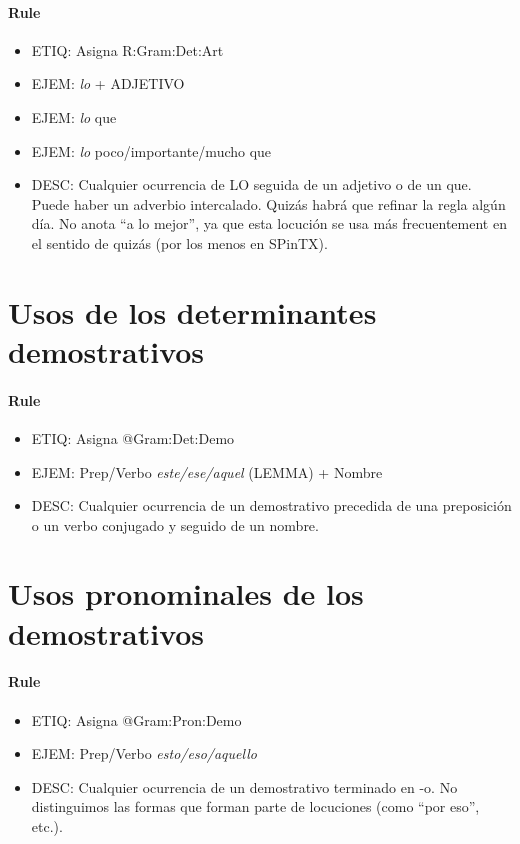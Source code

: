 \documentclass[11pt]{report}
\begin{document}
\paragraph*{Rule}
\begin{itemize}
\item ETIQ: Asigna R:Gram:Det:Art
\item EJEM: \emph{lo} + ADJETIVO 
\item EJEM: \emph{lo} que 
\item EJEM: \emph{lo} poco/importante/mucho que 
\item DESC: Cualquier ocurrencia de LO seguida de un adjetivo o de un que. Puede haber un adverbio intercalado. Quizás habrá que refinar la regla algún día. No anota ``a lo mejor'', ya que esta locución se usa más frecuentement en el sentido de quizás (por los menos en SPinTX).
\end{itemize}

\section{Usos de los determinantes demostrativos}
\paragraph*{Rule}
\begin{itemize}
\item ETIQ: Asigna @Gram:Det:Demo
\item EJEM: Prep/Verbo \emph{este/ese/aquel} (LEMMA) + Nombre
\item DESC: Cualquier ocurrencia de un demostrativo precedida de una preposición o un verbo conjugado y seguido de un nombre.
\end{itemize}

\section{Usos pronominales de los demostrativos}
\paragraph*{Rule}
\begin{itemize}
\item ETIQ: Asigna @Gram:Pron:Demo
\item EJEM: Prep/Verbo \emph{esto/eso/aquello}
\item DESC: Cualquier ocurrencia de un demostrativo terminado en -o. No distinguimos las formas que forman parte de locuciones (como ``por eso'', etc.).
\end{itemize}
\end{document}
